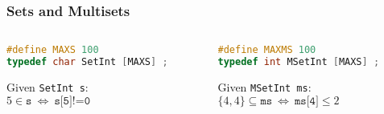 \documentclass[aspectratio=169]{beamer}
\begin{document}
\begin{frame}[fragile]\frametitle{Sets and Multisets}
  
\begin{columns}
\begin{column}{.48\textwidth}
\begin{lstlisting}[language=C++,emph={SetInt,MSetInt}]
#define MAXS 100
typedef char SetInt [MAXS] ;
\end{lstlisting}

Given \texttt{SetInt s}:
\\$5 \in \texttt{s} ~\Leftrightarrow~ \texttt{s[5]!=0}$
\end{column}
\begin{column}{.48\textwidth}
\begin{lstlisting}[language=C++,emph={SetInt,MSetInt}]
#define MAXMS 100
typedef int MSetInt [MAXS] ;
\end{lstlisting}

Given \texttt{MSetInt ms}:
\\$\{4,4\} \subseteq \texttt{ms} ~\Leftrightarrow~ \texttt{ms[4]}\leq 2$
\end{column}
\end{columns}

\end{frame}
\end{document}
